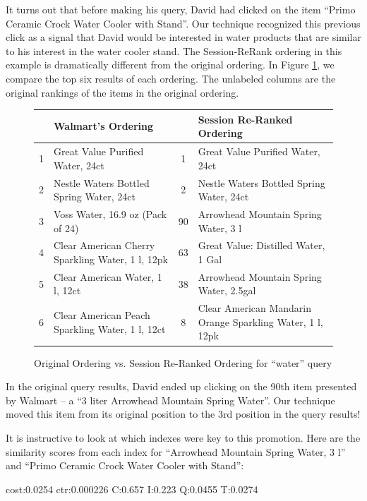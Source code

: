 \documentclass{article}
\begin{document}

It turns out that before making his query, David had clicked on the item ``Primo
Ceramic Crock Water Cooler with Stand''.  Our technique recognized this previous
click as a signal that David would be interested in water products that are
similar to his interest in the water cooler stand. The Session-ReRank ordering
in this example is dramatically different from the original ordering. In Figure
\ref{fig:compare_orderings}, we compare the top six results of each ordering.
The unlabeled columns are the original rankings of the items in the original
ordering.

\begin{figure}
    \centering
    \begin{tabular}{| c | p{7cm} | c | p{7cm} |}
        \hline
& Walmart's Ordering & & Session Re-Ranked Ordering \\ \hline
1  &   Great Value Purified Water, 24ct                 & 1  & Great Value Purified Water, 24ct \\ \hline
2  &   Nestle Waters Bottled Spring Water, 24ct         & 2  & Nestle Waters Bottled Spring Water, 24ct \\ \hline
3  &   Voss Water, 16.9 oz (Pack of 24)                 & 90 & Arrowhead Mountain Spring Water, 3 l \\ \hline
4  &   Clear American Cherry Sparkling Water, 1 l, 12pk & 63 & Great Value: Distilled Water, 1 Gal \\ \hline
5  &   Clear American Water, 1 l, 12ct                  & 38 & Arrowhead Mountain Spring Water, 2.5gal \\ \hline
6  &   Clear American Peach Sparkling Water, 1 l, 12ct  & 8  & Clear American Mandarin Orange Sparkling Water, 1 l, 12pk \\ \hline

    \end{tabular}
    \caption{Original Ordering vs. Session Re-Ranked Ordering for ``water'' query}
    \label{fig:compare_orderings}
\end{figure}


In the original query results, David ended up clicking on the 90th item
presented by Walmart -- a ``3 liter Arrowhead Mountain Spring Water''. Our
technique moved this item from its original position to the 3rd position in the
query results!

It is instructive to look at which indexes were key to this promotion. Here are
the similarity scores from each index for ``Arrowhead Mountain Spring Water, 3
l'' and ``Primo Ceramic Crock Water Cooler with Stand'':



cost:0.0254 ctr:0.000226 C:0.657 I:0.223 Q:0.0455 T:0.0274
\end{document}
